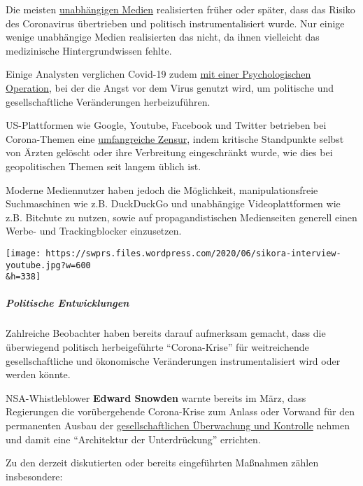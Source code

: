 Die meisten \href{https://swprs.org/medien-navigator/}{unabhängigen
Medien} realisierten früher oder später, dass das Risiko des Coronavirus
übertrieben und politisch instrumentalisiert wurde. Nur einige wenige
unabhängige Medien realisierten das nicht, da ihnen vielleicht das
medizinische Hintergrundwissen fehlte.

Einige Analysten verglichen Covid-19 zudem
\href{https://digwithin.net/2020/06/03/coronavirus-scare/}{mit einer
Psychologischen Operation}, bei der die Angst vor dem Virus genutzt
wird, um politische und gesellschaftliche Veränderungen herbeizuführen.

US-Plattformen wie Google, Youtube, Facebook und Twitter betrieben bei
Corona-Themen eine
\href{https://nypost.com/2020/05/16/youtube-censors-epidemiologist-knut-wittkowski-for-opposing-lockdown/}{umfangreiche
Zensur}, indem kritische Standpunkte selbst von Ärzten gelöscht oder
ihre Verbreitung eingeschränkt wurde, wie dies bei geopolitischen Themen
seit langem üblich ist.

Moderne Mediennutzer haben jedoch die Möglichkeit, manipulationsfreie
Suchmaschinen wie z.B. DuckDuckGo und unabhängige Videoplattformen wie
z.B. Bitchute zu nutzen, sowie auf propagandistischen Medienseiten
generell einen Werbe- und Trackingblocker einzusetzen.

\texttt{[image: https://swprs.files.wordpress.com/2020/06/sikora-interview-youtube.jpg?w=600\\\&h=338]}

\hypertarget{politische-entwicklungen}{%
\subparagraph{\texorpdfstring{\textbf{Politische
Entwicklungen}}{Politische Entwicklungen}}\label{politische-entwicklungen}}

Zahlreiche Beobachter haben bereits darauf aufmerksam gemacht, dass die
überwiegend politisch herbeigeführte ``Corona-Krise'' für weitreichende
gesellschaftliche und ökonomische Veränderungen instrumentalisiert wird
oder werden könnte.

NSA-Whistleblower \textbf{Edward Snowden} warnte bereits im März, dass
Regierungen die vorübergehende Corona-Krise zum Anlass oder Vorwand für
den permanenten Ausbau der
\href{https://www.youtube.com/watch?v=-pcQFTzck_c}{gesellschaftlichen
Überwachung und Kontrolle} nehmen und damit eine ``Architektur der
Unterdrückung'' errichten.

Zu den derzeit diskutierten oder bereits eingeführten Maßnahmen zählen
insbesondere:

